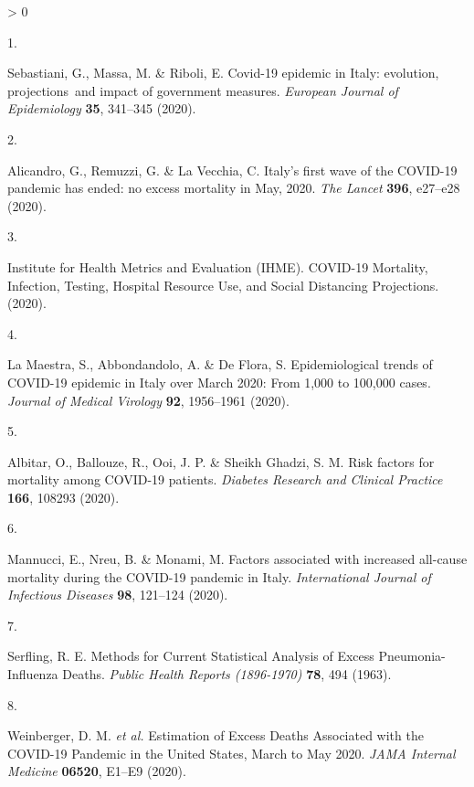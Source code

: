 \documentclass[
]{article}
\newlength{\cslhangindent}
\newlength{\csllabelwidth}
\newenvironment{CSLReferences}[2] %
 {%
  \setlength{\parindent}{0pt}
  \ifodd #1 \everypar{\setlength{\hangindent}{\cslhangindent}}\ignorespaces\fi
  \ifnum #2 > 0
  \setlength{\parskip}{#2\baselineskip}
  \fi
 }%
 {}
\newcommand{\CSLLeftMargin}[1]{\parbox[t]{\csllabelwidth}{#1}}
\newcommand{\CSLRightInline}[1]{\parbox[t]{\linewidth - \csllabelwidth}{#1}\break}
\begin{document}
\hypertarget{refs}{}
\begin{CSLReferences}{0}{0}
\leavevmode\hypertarget{ref-Sebastiani2020}{}%
\CSLLeftMargin{1. }
\CSLRightInline{Sebastiani, G., Massa, M. \& Riboli, E. {Covid-19 epidemic in Italy: evolution, projections~and impact of government measures}. \emph{European Journal of Epidemiology} \textbf{35}, 341--345 (2020).}

\leavevmode\hypertarget{ref-Alicandro2020}{}%
\CSLLeftMargin{2. }
\CSLRightInline{Alicandro, G., Remuzzi, G. \& La Vecchia, C. {Italy's first wave of the COVID-19 pandemic has ended: no excess mortality in May, 2020}. \emph{The Lancet} \textbf{396}, e27--e28 (2020).}

\leavevmode\hypertarget{ref-InstituteforHealthMetricsandEvaluationIHME2020}{}%
\CSLLeftMargin{3. }
\CSLRightInline{Institute for Health Metrics and Evaluation (IHME). {COVID-19 Mortality, Infection, Testing, Hospital Resource Use, and Social Distancing Projections}. (2020).}

\leavevmode\hypertarget{ref-LaMaestra2020}{}%
\CSLLeftMargin{4. }
\CSLRightInline{La Maestra, S., Abbondandolo, A. \& De Flora, S. {Epidemiological trends of COVID-19 epidemic in Italy over March 2020: From 1,000 to 100,000 cases}. \emph{Journal of Medical Virology} \textbf{92}, 1956--1961 (2020).}

\leavevmode\hypertarget{ref-Albitar2020}{}%
\CSLLeftMargin{5. }
\CSLRightInline{Albitar, O., Ballouze, R., Ooi, J. P. \& Sheikh Ghadzi, S. M. {Risk factors for mortality among COVID-19 patients}. \emph{Diabetes Research and Clinical Practice} \textbf{166}, 108293 (2020).}

\leavevmode\hypertarget{ref-Mannucci2020}{}%
\CSLLeftMargin{6. }
\CSLRightInline{Mannucci, E., Nreu, B. \& Monami, M. {Factors associated with increased all-cause mortality during the COVID-19 pandemic in Italy}. \emph{International Journal of Infectious Diseases} \textbf{98}, 121--124 (2020).}

\leavevmode\hypertarget{ref-Serfling1963}{}%
\CSLLeftMargin{7. }
\CSLRightInline{Serfling, R. E. {Methods for Current Statistical Analysis of Excess Pneumonia-Influenza Deaths}. \emph{Public Health Reports (1896-1970)} \textbf{78}, 494 (1963).}

\leavevmode\hypertarget{ref-Weinberger2020a}{}%
\CSLLeftMargin{8. }
\CSLRightInline{Weinberger, D. M. \emph{et al.} {Estimation of Excess Deaths Associated with the COVID-19 Pandemic in the United States, March to May 2020}. \emph{JAMA Internal Medicine} \textbf{06520}, E1--E9 (2020).}


\end{CSLReferences}
\end{document}
